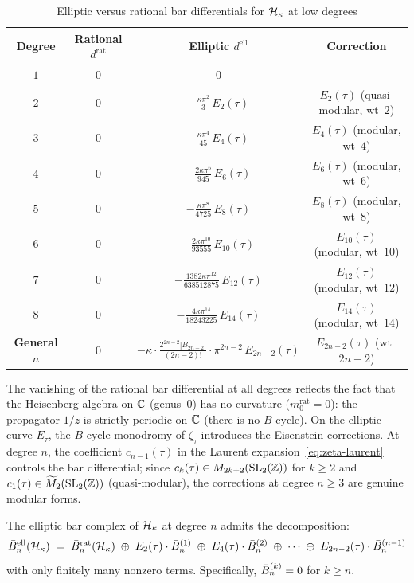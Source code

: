 \begin{table}[ht]
\centering
\caption{Elliptic versus rational bar differentials
for $\mathcal{H}_\kappa$ at low degrees}
\label{tab:ell-vs-rat-bar}
\begin{tabular}{|c|c|c|c|}
\hline
\textbf{Degree} & \textbf{Rational $d^{\mathrm{rat}}$}
& \textbf{Elliptic $d^{\mathrm{ell}}$}
& \textbf{Correction} \\
\hline
$1$ & $0$ & $0$ & --- \\
\hline
$2$ & $0$ & $-\frac{\kappa\pi^2}{3}\,E_2(\tau)$
& $E_2(\tau)$ (quasi-modular, wt~$2$) \\
\hline
$3$ & $0$ & $-\frac{\kappa\pi^4}{45}\,E_4(\tau)$
& $E_4(\tau)$ (modular, wt~$4$) \\
\hline
$4$ & $0$ & $-\frac{2\kappa\pi^6}{945}\,E_6(\tau)$
& $E_6(\tau)$ (modular, wt~$6$) \\
\hline
$5$ & $0$ & $-\frac{\kappa\pi^8}{4725}\,E_8(\tau)$
& $E_8(\tau)$ (modular, wt~$8$) \\
\hline
$6$ & $0$ & $-\frac{2\kappa\pi^{10}}{93555}\,E_{10}(\tau)$
& $E_{10}(\tau)$ (modular, wt~$10$) \\
\hline
$7$ & $0$ & $-\frac{1382\kappa\pi^{12}}{638512875}\,E_{12}(\tau)$
& $E_{12}(\tau)$ (modular, wt~$12$) \\
\hline
$8$ & $0$ & $-\frac{4\kappa\pi^{14}}{18243225}\,E_{14}(\tau)$
& $E_{14}(\tau)$ (modular, wt~$14$) \\
\hline
\textbf{General $n$}
& $0$ & $-\kappa \cdot \tfrac{2^{2n-2}|B_{2n-2}|}{(2n-2)!}
  \cdot \pi^{2n-2}\,E_{2n-2}(\tau)$
& $E_{2n-2}(\tau)$ (wt~$2n{-}2$) \\
\hline
\end{tabular}
\end{table}

\noindent
The vanishing of the rational bar differential at all degrees
reflects the fact that the Heisenberg algebra on $\mathbb{C}$ (genus~$0$)
has no curvature ($m_0^{\mathrm{rat}} = 0$): the propagator
$1/z$ is strictly periodic on $\mathbb{C}$ (there is no $B$-cycle).
On the elliptic curve $E_\tau$, the $B$-cycle monodromy of
$\zeta_\tau$ introduces the Eisenstein corrections.  At degree $n$,
the coefficient $c_{n-1}(\tau)$ in the Laurent
expansion~\eqref{eq:zeta-laurent} controls the bar differential;
since $c_k(\tau) \in M_{2k+2}(\mathrm{SL}_2(\mathbb{Z}))$ for $k \geq 2$
and $c_1(\tau) \in \widetilde{M}_2(\mathrm{SL}_2(\mathbb{Z}))$ (quasi-modular),
the corrections at degree $n \geq 3$ are genuine modular forms.

\begin{proposition}\label{prop:ell-bar-decomposition}
The elliptic bar complex of $\mathcal{H}_\kappa$ at degree $n$ admits
the decomposition:
\begin{equation}\label{eq:ell-bar-decomp}
\bar{B}^{\mathrm{ell}}_n(\mathcal{H}_\kappa)
\;=\; \bar{B}^{\mathrm{rat}}_n(\mathcal{H}_\kappa)
\;\oplus\; E_2(\tau) \cdot \bar{B}^{(1)}_n
\;\oplus\; E_4(\tau) \cdot \bar{B}^{(2)}_n
\;\oplus\; \cdots
\;\oplus\; E_{2n-2}(\tau) \cdot \bar{B}^{(n-1)}_n
\end{equation}
with only finitely many nonzero terms.  Specifically,
$\bar{B}^{(k)}_n = 0$ for $k \geq n$.
\end{proposition}

